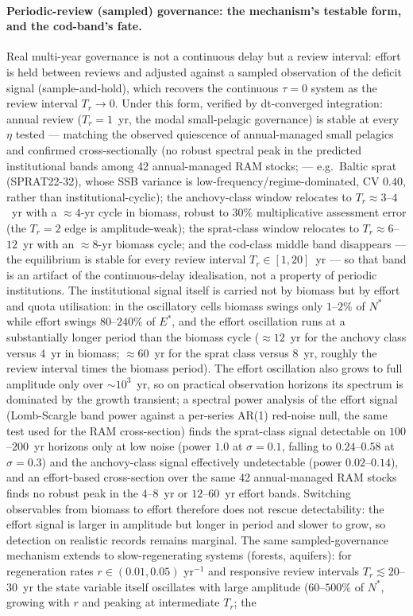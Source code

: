 \documentclass[twocolumn,10pt]{article}
\begin{document}
\paragraph{Periodic-review (sampled) governance: the mechanism's testable form, and the cod-band's fate.} Real multi-year governance is not a continuous delay but a review interval: effort is held between reviews and adjusted against a sampled observation of the deficit signal (sample-and-hold), which recovers the continuous $\tau=0$ system as the review interval $T_r\to0$. Under this form, verified by dt-converged integration: annual review ($T_r=1$~yr, the modal small-pelagic governance) is stable at every $\eta$ tested --- matching the observed quiescence of annual-managed small pelagics and confirmed cross-sectionally (no robust spectral peak in the predicted institutional bands among 42 annual-managed RAM stocks; \cite{ricard2012} --- e.g.\ Baltic sprat (SPRAT22-32), whose SSB variance is low-frequency/regime-dominated, CV $0.40$, rather than institutional-cyclic); the anchovy-class window relocates to $T_r\approx3$--$4$~yr with a $\approx4$-yr cycle in biomass, robust to $30\%$ multiplicative assessment error (the $T_r=2$ edge is amplitude-weak); the sprat-class window relocates to $T_r\approx6$--$12$~yr with an $\approx8$-yr biomass cycle; and the cod-class middle band disappears --- the equilibrium is stable for every review interval $T_r\in[1,20]$~yr --- so that band is an artifact of the continuous-delay idealisation, not a property of periodic institutions. The institutional signal itself is carried not by biomass but by effort and quota utilisation: in the oscillatory cells biomass swings only $1$--$2\%$ of $N^*$ while effort swings $80$--$240\%$ of $E^*$, and the effort oscillation runs at a substantially longer period than the biomass cycle ($\approx12$~yr for the anchovy class versus $4$~yr in biomass; $\approx60$~yr for the sprat class versus $8$~yr, roughly the review interval times the biomass period). The effort oscillation also grows to full amplitude only over $\sim10^3$~yr, so on practical observation horizons its spectrum is dominated by the growth transient; a spectral power analysis of the effort signal (Lomb-Scargle band power against a per-series AR(1) red-noise null, the same test used for the RAM cross-section) finds the sprat-class signal detectable on $100$--$200$~yr horizons only at low noise (power $1.0$ at $\sigma=0.1$, falling to $0.24$--$0.58$ at $\sigma=0.3$) and the anchovy-class signal effectively undetectable (power $0.02$--$0.14$), and an effort-based cross-section over the same 42 annual-managed RAM stocks finds no robust peak in the $4$--$8$~yr or $12$--$60$~yr effort bands. Switching observables from biomass to effort therefore does not rescue detectability: the effort signal is larger in amplitude but longer in period and slower to grow, so detection on realistic records remains marginal. The same sampled-governance mechanism extends to slow-regenerating systems (forests, aquifers): for regeneration rates $r\in(0.01,0.05)$ yr$^{-1}$ and responsive review intervals $T_r\lesssim20$--$30$~yr the state variable itself oscillates with large amplitude ($60$--$500\%$ of $N^*$, growing with $r$ and peaking at intermediate $T_r$; the 
\end{document}

